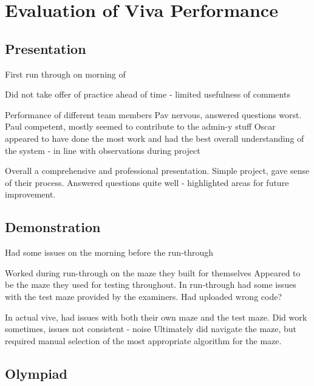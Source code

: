 


\section{Evaluation of Viva Performance}\label{sec:viva.tex}
    \subsection{Presentation}\label{subsec:viva-presentation}
        First run through on morning of

        Did not take offer of practice ahead of time - limited usefulness of comments

        Performance of different team members
        Pav nervous, answered questions worst.
        Paul competent, mostly seemed to contribute to the admin-y stuff
        Oscar appeared to have done the most work and had the best overall understanding of the system - in line with observations during project

        Overall a comprehensive and professional presentation.
        Simple project, gave sense of their process.
        Answered questions quite well - highlighted areas for future improvement.

    \subsection{Demonstration}\label{subsec:viva-demonstration}
        Had some issues on the morning before the run-through

        Worked during run-through on the maze they built for themselves
        Appeared to be the maze they used for testing throughout.
        In run-through had some issues with the test maze provided by the examiners.
        Had uploaded wrong code?

        In actual vive, had issues with both their own maze and the test maze.
        Did work sometimes, issues not consistent - noise
        Ultimately did navigate the maze, but required manual selection of the most appropriate algorithm for the maze.

    \subsection{Olympiad}\label{subsec:viva-olympiad}
